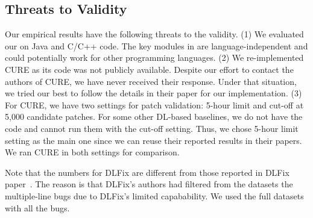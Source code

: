 \subsection{Threats to Validity}



Our empirical results have the following threats to the validity. (1)
We evaluated our {\tool} on Java and C/C++ code.  The key modules in
{\tool} are language-independent and could potentially work for other
programming languages. (2) We re-implemented CURE as its code was not
publicly available. Despite our effort to contact the authors
of CURE, we have never received their response. Under that situation,
we tried our best to follow the details in their paper for our
implementation.
(3) For CURE, we have two settings for patch validation: 5-hour limit
and cut-off at 5,000 candidate patches. For some other DL-based
baselines, we do not have the code and cannot run them with the
cut-off setting. Thus, we chose 5-hour limit setting as the main one
since we can reuse their reported results in their papers. We ran
CURE in both settings for comparison.

Note that the numbers for DLFix are different from those reported in
DLFix paper~\cite{icse20}. The reason is that DLFix's authors had
filtered from the datasets the multiple-line bugs due to DLFix's
limited capabability. We used the full datasets with all the bugs.



